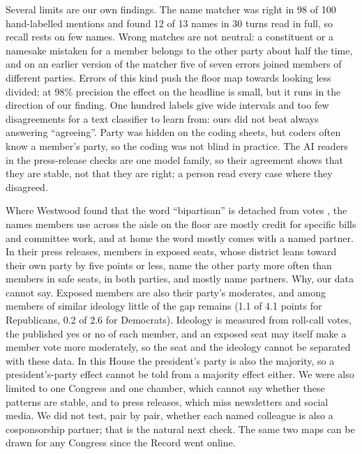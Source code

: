 \documentclass[9pt,twocolumn,twoside]{pnas-new}
\begin{document}
Several limits are our own findings. The name matcher was right in 98 of 100 hand-labelled mentions and found 12
of 13 names in 30 turns read in full, so recall rests on few names. Wrong matches are not neutral: a constituent or a
namesake mistaken for a member belongs to the other party about half the time, and on an earlier version of the
matcher five of seven errors joined members of different parties. Errors of this kind push the floor map towards
looking less divided; at 98\% precision the effect on the headline is small, but it runs in the direction of our
finding. One hundred labels give wide intervals and too few disagreements for a text classifier to learn from: ours
did not beat always answering ``agreeing''. Party was hidden on the coding sheets, but coders often know a member's
party, so the coding was not blind in practice. The AI readers in the press-release checks are one model family, so
their agreement shows that they are stable, not that they are right; a person read every case where they disagreed.

Where Westwood found that the word ``bipartisan'' is detached from votes \cite{westwood2022}, the names members use
across the aisle on the floor are mostly credit for specific bills and committee work, and at home the word mostly
comes with a named partner. In their press releases, members in exposed seats, whose district leans toward their own
party by five points or less, name the other party more often than members in safe seats, in both parties, and
mostly name partners. Why, our data cannot say. Exposed members are also their party's moderates, and among members of
similar ideology little of the gap remains (1.1 of 4.1 points for Republicans, 0.2 of 2.6 for Democrats). Ideology
is measured from roll-call votes, the published yes or no of each member, and an exposed seat may itself make a member
vote more moderately, so the seat and the ideology cannot be separated with these data. In this House the president's
party is also the majority, so a president's-party effect cannot be told from a majority effect either. We were also limited to one Congress and one
chamber, which cannot say whether these patterns are stable, and to press releases, which miss newsletters and social
media. We did not test, pair by pair, whether each named colleague is also a cosponsorship partner; that is the
natural next check. The same two maps can be drawn for any Congress since the Record went online.
\end{document}
